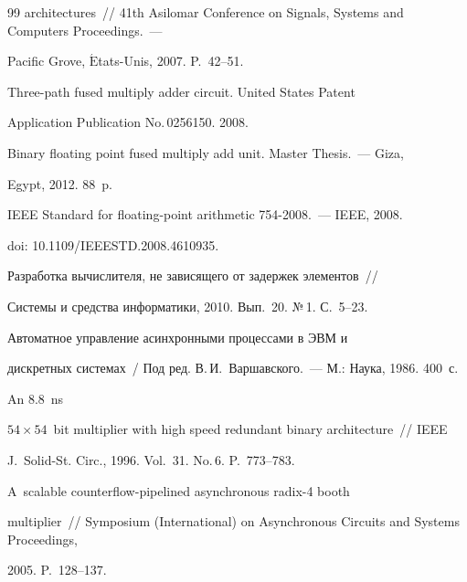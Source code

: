 {{\begin{thebibliography}{99}
architectures~/\!\!/ 41th Asilomar Conference on Signals, Systems and Computers Proceedings.~---

Pacific Grove, $\acute{\mbox{E}}$tats-Unis, 2007. P.~42--51.



Three-path fused multiply adder circuit. United States Patent

Application Publication  No.\,0256150. 2008.


 Binary floating point fused multiply add unit. Master Thesis.~--- Giza,

Egypt, 2012. 88~p.


IEEE Standard for floating-point arithmetic 754-2008.~--- IEEE, 2008.

doi: 10.1109/IEEESTD.2008.4610935.


 Разработка вычислителя, не зависящего от задержек элементов~/\!\!/

Системы и средства информатики, 2010. Вып.~20. №\,1. С.~5--23.


 Автоматное управление асинхронными процессами в ЭВМ и

дискретных системах~/ Под ред. В.\,И.~Варшавского.~--- М.: Наука, 1986. 400~с.




 An 8.8~ns

$54\times54$~bit multiplier with high speed redundant binary architecture~/\!\!/ IEEE

J.~Solid-St. Circ., 1996. Vol.~31. No.\,6. P.~773--783.


 A~scalable counterflow-pipelined asynchronous radix-4 booth

multiplier~/\!\!/ Symposium (International) on Asynchronous Circuits and Systems Proceedings,

2005. P.~128--137.




\end{thebibliography}}}
